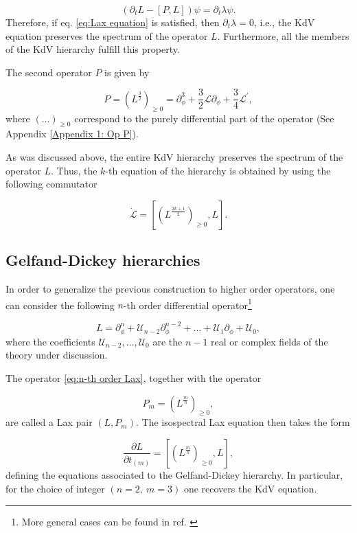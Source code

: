 \documentclass[letterpaper,11pt,oneside]{book}
\begin{document}
\[
\left(\partial_{t}L-\left[P,L\right]\right)\psi=\partial_{t}\lambda\psi.
\]
Therefore, if eq. \eqref{eq:Lax equation} is satisfied, then $\partial_{t}\lambda=0$,
i.e., the KdV equation preserves the spectrum
of the operator $L$. Furthermore, all the members of the KdV hierarchy fulfill this property.

The second operator $P$ is given by

\[
P=\left(L^{\frac{3}{2}}\right)_{\geq0}=\partial_{\phi}^{3}+\frac{3}{2}\mathcal{L}\partial_{\phi}+\frac{3}{4}\mathcal{L}^{\prime},
\]
where $\left(\ldots\right)_{\geq0}$ correspond to the purely differential
part of the operator (See Appendix \ref{Appendix 1: Op P}).

As was discussed above, the entire KdV hierarchy preserves the spectrum
of the operator $L$. Thus, the $k$-th equation of the hierarchy
is obtained by using the following commutator

\[
\dot{\mathcal{L}}=\left[\left(L^{\frac{2k+1}{2}}\right)_{\geq0},L\right].
\]


\subsection{Gelfand-Dickey hierarchies}

In order to generalize the previous construction to higher order operators, one can consider the following $n$-th order differential operator\footnote{More general cases can be found in ref. \cite{Blaszak1998}}

\begin{equation}
	L=\partial_{\phi}^{n}+\mathcal{U}_{n-2}\partial_{\phi}^{n-2}+\ldots+\mathcal{U}_{1}\partial_{\phi}+\mathcal{U}_{0},\label{eq:n-th order Lax}
\end{equation}
where the coefficients $\mathcal{U}_{n-2},\ldots,\mathcal{U}_{0}$
are the $n-1$ real or complex fields of the theory under discussion.

The operator \eqref{eq:n-th order Lax}, together with the operator

\[
P_{m}=\left(L^{\frac{m}{n}}\right)_{\geq0},
\]
are called a Lax pair $\left(L,P_{m}\right)$. The isospectral Lax equation then takes the form

\begin{equation}
	\frac{\partial L}{\partial t_{\left(m\right)}}=\left[\left(L^{\frac{m}{n}}\right)_{\geq0},L\right],\label{eq:Lax equation final}
\end{equation}
defining the equations associated to the Gelfand-Dickey hierarchy. In particular, for the choice of integer $\left(n=2,\:m=3\right)$ one recovers the KdV equation.
\end{document}
